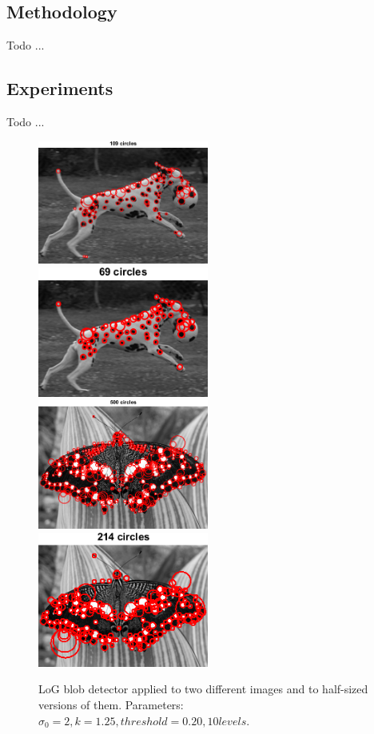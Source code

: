 \documentclass[a4paper,psfig,subfigure,epsfig,fleqn,ausarbeitung,amssmb,float,caption,fontenc]{article}
\begin{document}
\subsection{Methodology}

Todo ...

\subsection{Experiments}

Todo ...

\begin{figure}[h]
	\includegraphics[width=0.5\textwidth]{figures/a3_dalmation_k020_full.png}
	\includegraphics[width=0.5\textwidth]{figures/a3_dalmation_k020_half.png}
	\includegraphics[width=0.5\textwidth]{figures/a3_butterfly_k020.png}
	\includegraphics[width=0.5\textwidth]{figures/a3_butterfly_k020_small.png}
	\caption{LoG blob detector applied to two different images and to half-sized versions of them. Parameters: $\sigma_0=2, k=1.25, threshold=0.20, 10 levels$.}
	\label{fig:a3:thresholds}
\end{figure}
\end{document}
